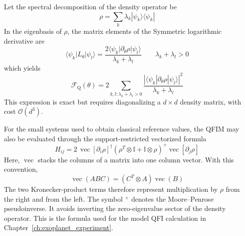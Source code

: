\begin{remark}
    Let the spectral decomposition of the density operator be
    \begin{equation}
        \rho
        =
        \sum_k
        \lambda_k
        |\psi_k\rangle\langle\psi_k|
    \end{equation}
    In the eigenbasis of $\rho$, the matrix elements of the Symmetric logarithmic derivative are
    \begin{equation}
        \langle\psi_k|L_\theta|\psi_l\rangle
        =\frac{2\langle\psi_k|\partial_\theta\rho|\psi_l\rangle}
        {\lambda_k+\lambda_l}
        \qquad \lambda_k+\lambda_l>0
        \label{eq:sld_spectral_elements}
    \end{equation}
    which yields
    \begin{equation}
        \mathcal{F}_{\mathrm{Q}}(\theta)
        =2\sum_{k,l:\lambda_k+\lambda_l>0}
        \frac{|\langle\psi_k|\partial_\theta\rho|\psi_l\rangle|^2}
        {\lambda_k+\lambda_l}
        \label{eq:qfi_spectral_explicit}
    \end{equation}
    This expression is exact but requires diagonalizing a $d\times d$ density matrix, with cost $\mathcal{O}(d^3)$.
\end{remark}
\begin{remark}
    For the small systems used to obtain classical reference values, the QFIM may also be evaluated through the support-restricted vectorized formula~\cite{safranek_2018}
    \begin{equation}
        H_{ij}
        =2\,\operatorname{vec}[\partial_i\rho]^\dagger
        \left(\rho^T\otimes\mathbb{I}+\mathbb{I}\otimes\rho\right)^+
        \operatorname{vec}[\partial_j\rho]
        \label{eq:safranek_vectorized}
    \end{equation}
    Here, $\operatorname{vec}$ stacks the columns of a matrix into one column vector. With this convention,
    \begin{equation}
        \operatorname{vec}(ABC)
        =
        \left(C^T\otimes A\right)\operatorname{vec}(B)
    \end{equation}
    The two Kronecker-product terms therefore represent multiplication by $\rho$ from the right and from the left. The symbol ${}^{+}$ denotes the Moore--Penrose pseudoinverse. It avoids inverting the zero-eigenvalue sector of the density operator. This is the formula used for the model QFI calculation in Chapter~\ref{ch:exoplanet_experiment}.
\end{remark}


